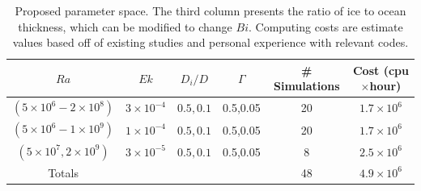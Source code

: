 \documentclass[12pt]{article}
\def\lb{\left(}
\def\rb{\right)}
\begin{document}
\begin{table}
\begin{center}
\begin{tabular}{|c|c|c|c|c|c|}
\hline
$Ra$&$Ek$&$D_{i}/D$& $\Gamma$ &\# Simulations & Cost (cpu$\times$hour)\\
		\hline
$\lb 5 \times 10^{6} - 2 \times 10^{8} \rb $ & $3 \times 10^{-4} $ & $0.5,0.1$&0.5,0.05&20&$1.7 \times 10^{6}$\\
  	\hline
$\lb 5 \times 10^{6} - 1 \times 10^{9} \rb $ & $1 \times 10^{-4} $ & $0.5,0.1$&0.5,0.05&20&$1.7\times 10^{6}$\\
  	\hline
$\lb 5\times 10^{7}, 2 \times 10^{9} \rb $ & $3 \times 10^{-5} $ & $0.5,0.1$&0.5,0.05&8&$2.5\times 10^6$\\
		\hline
		\hline
Totals & & & &48&$4.9 \times 10^6$ \\
		\hline
\end{tabular}
\end{center}
\caption{Proposed parameter space. The third column presents the ratio of ice to ocean thickness, which can be modified to change $Bi$. Computing costs are estimate values based off of existing studies \citep{dL23,rM19} and personal experience with relevant codes.}
\label{t:param}
\end{table}
\end{document}
